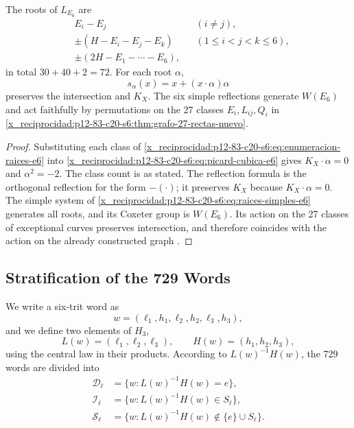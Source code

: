 \begin{proposition}
\label{x_reciprocidad:p12-83-c20-s6:prop:setenta-dos-raices-e6}
The roots of \(L_{E_6}\) are
\begin{equation}
 \begin{aligned}
 &E_i-E_j &&(i\ne j),\\
 &\pm(H-E_i-E_j-E_k) &&(1\le i<j<k\le6),\\
 &\pm(2H-E_1-\cdots-E_6),
 \end{aligned}
 \label{x_reciprocidad:p12-83-c20-s6:eq:enumeracion-raices-e6}
\end{equation}
in total \(30+40+2=72\). For each root \(\alpha\),
\begin{equation}
 s_\alpha(x)=x+(x\cdot\alpha)\alpha
 \label{x_reciprocidad:p12-83-c20-s6:eq:reflexion-raiz-e6}
\end{equation}
preserves the intersection and \(K_X\). The six simple reflections generate
\(W(E_6)\) and act faithfully by permutations on the 27 classes
\(E_i,L_{ij},Q_i\) in \cref{x_reciprocidad:p12-83-c20-s6:thm:grafo-27-rectas-nuevo}.
\end{proposition}

\begin{proof}
Substituting each class of \cref{x_reciprocidad:p12-83-c20-s6:eq:enumeracion-raices-e6} into
\cref{x_reciprocidad:p12-83-c20-s6:eq:picard-cubica-e6} gives \(K_X\cdot\alpha=0\) and
\(\alpha^2=-2\). The class count is as stated. The reflection formula
is the orthogonal reflection for the form \(-(\cdot)\); it preserves \(K_X\) because
\(K_X\cdot\alpha=0\). The simple system of
\cref{x_reciprocidad:p12-83-c20-s6:eq:raices-simples-e6} generates all roots, and its Coxeter group is
\(W(E_6)\). Its action on the 27 classes of exceptional curves preserves
intersection, and therefore coincides with the action on the already
constructed graph \cite{x_reciprocidad:Manivel2005}.
\end{proof}

\subsection{Stratification of the 729 Words}

We write a six-trit word as
\[
 w=(\ell_1,h_1,\ell_2,h_2,\ell_3,h_3),
\]
and we define two elements of \(H_3\),
\[
 L(w)=(\ell_1,\ell_2,\ell_3),\qquad
 H(w)=(h_1,h_2,h_3),
\]
using the central law in their products. According to
\(L(w)^{-1}H(w)\), the 729 words are divided into
\begin{align*}
 \mathcal D_\ell&=\{w:L(w)^{-1}H(w)=e\},\\
 \mathcal I_\ell&=\{w:L(w)^{-1}H(w)\in S_\ell\},\\
 \mathcal S_\ell&=\{w:L(w)^{-1}H(w)\notin\{e\}\cup S_\ell\}.
\end{align*}

